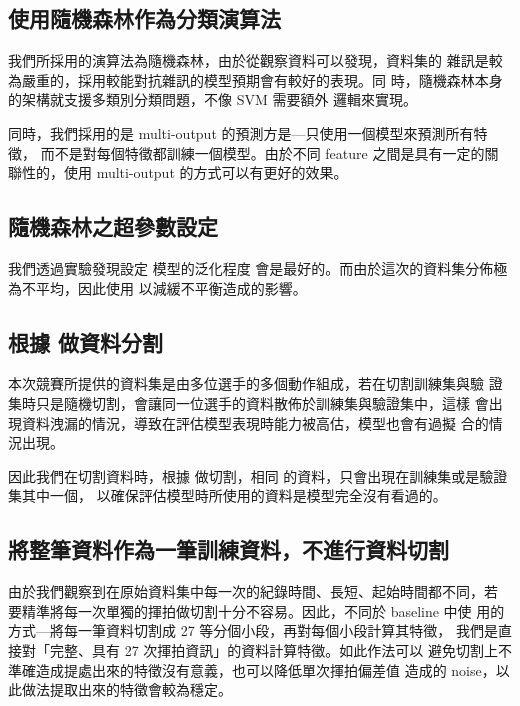 \documentclass[12pt, a4paper]{article}
\begin{document}
        \subsection{使用隨機森林作為分類演算法}
            我們所採用的演算法為隨機森林，由於從觀察資料可以發現，資料集的
            雜訊是較為嚴重的，採用較能對抗雜訊的模型預期會有較好的表現。同
            時，隨機森林本身的架構就支援多類別分類問題，不像 SVM 需要額外
            邏輯來實現。
            
            同時，我們採用的是 multi-output 的預測方是---只使用一個模型來預測所有特徵，
            而不是對每個特徵都訓練一個模型。由於不同 feature 之間是具有一定的關
            聯性的，使用 multi-output 的方式可以有更好的效果。
        \subsection{隨機森林之超參數設定}
            我們透過實驗發現設定  模型的泛化程度
            會是最好的。而由於這次的資料集分佈極為不平均，因此使用
             以減緩不平衡造成的影響。
        \subsection{根據  做資料分割}
            本次競賽所提供的資料集是由多位選手的多個動作組成，若在切割訓練集與驗
            證集時只是隨機切割，會讓同一位選手的資料散佈於訓練集與驗證集中，這樣
            會出現資料洩漏的情況，導致在評估模型表現時能力被高估，模型也會有過擬
            合的情況出現。

            因此我們在切割資料時，根據  做切割，相同
             的資料，只會出現在訓練集或是驗證集其中一個，
            以確保評估模型時所使用的資料是模型完全沒有看過的。
        \subsection{將整筆資料作為一筆訓練資料，不進行資料切割}
            由於我們觀察到在原始資料集中每一次的紀錄時間、長短、起始時間都不同，若
            要精準將每一次單獨的揮拍做切割十分不容易。因此，不同於 baseline 中使
            用的方式---將每一筆資料切割成 27 等分個小段，再對每個小段計算其特徵，
            我們是直接對「完整、具有 27 次揮拍資訊」的資料計算特徵。如此作法可以
            避免切割上不準確造成提處出來的特徵沒有意義，也可以降低單次揮拍偏差值
            造成的 noise，以此做法提取出來的特徵會較為穩定。
\end{document}
